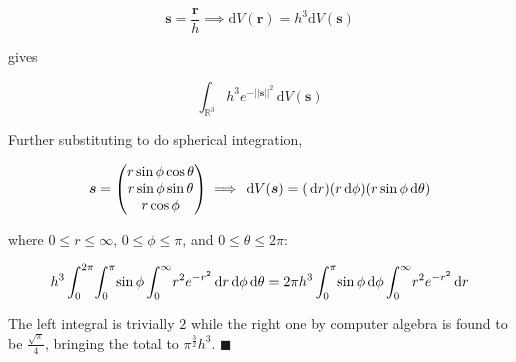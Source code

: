 \documentclass[../main.tex]{subfiles}
\begin{document}
\begin{equation}
    \bm{s} = \frac{\bm{r}}{h} \implies \mathrm{d}V(\bm{r}) = h^3 \mathrm{d}V(\bm{s})
\end{equation}

gives

\begin{equation}
    {\displaystyle \int_{\mathbb{R}^3} \!
        h^3 e^{-||\bm{s}||^2}
    \, \mathrm{d} V(\bm{s}) }
\end{equation}

Further substituting to do spherical integration,

\begin{equation}
    \bm{s} =
    \begin{pmatrix}
        r \sin \phi \cos \theta \\
        r \sin \phi \sin \theta \\
        r \cos \phi
    \end{pmatrix}
    \implies \,\mathrm{d} V(\bm{s}) = (\,\mathrm{d} r) (r \,\mathrm{d} \phi) (r \sin \phi \,\mathrm{d} \theta)
\end{equation}

where $0 \le r \le \infty$, $0 \le \phi \le \pi$, and $0 \le \theta \le 2\pi$:

\begin{equation}
    h^3 \int_0^{2\pi} \! \int_0^\pi \! \sin \phi
        \int_0^\infty \! r^2 e^{-r^2} \,\mathrm{d} r
        \,\mathrm{d} \phi \,\mathrm{d} \theta
    = 2\pi h^3 \int_0^\pi \! \sin \phi \,\mathrm{d} \phi \int_0^\infty \! r^2 e^{-r^2} \,\mathrm{d} r
\end{equation}

The left integral is trivially $2$ while the right one by computer algebra is found to be
$\frac{\sqrt{\pi}}{4}$, bringing the total to $\pi^\frac{3}{2} h^3$. $\blacksquare$
\end{document}
